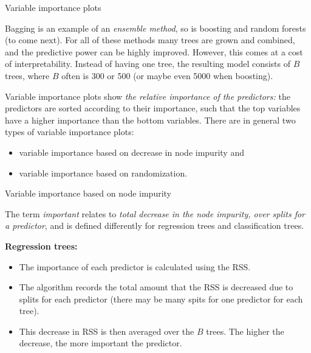\documentclass[ignorenonframetext,]{beamer}
\providecommand{\tightlist}{%
  \setlength{\itemsep}{0pt}\setlength{\parskip}{0pt}}
\begin{document}
\begin{frame}

\begin{block}{Variable importance plots}

Bagging is an example of an \emph{ensemble method}, so is boosting and
random forests (to come next). For all of these methods many trees are
grown and combined, and the predictive power can be highly improved.
However, this comes at a cost of interpretability. Instead of having one
tree, the resulting model consists of \(B\) trees, where \(B\) often is
300 or 500 (or maybe even 5000 when boosting).

Variable importance plots show \emph{the relative importance of the
predictors:} the predictors are sorted according to their importance,
such that the top variables have a higher importance than the bottom
variables. There are in general two types of variable importance plots:

\begin{itemize}
\tightlist
\item
  variable importance based on decrease in node impurity and
\item
  variable importance based on randomization.
\end{itemize}

\end{block}

\end{frame}

\begin{frame}

\begin{block}{Variable importance based on node impurity}

The term \emph{important} relates to \emph{total decrease in the node
impurity, over splits for a predictor}, and is defined differently for
regression trees and classification trees.

\textbf{Regression trees:}

\begin{itemize}
\tightlist
\item
  The importance of each predictor is calculated using the RSS.
\item
  The algorithm records the total amount that the RSS is decreased due
  to splits for each predictor (there may be many spits for one
  predictor for each tree).
\item
  This decrease in RSS is then averaged over the \(B\) trees. The higher
  the decrease, the more important the predictor.
\end{itemize}

\end{block}

\end{frame}
\end{document}
